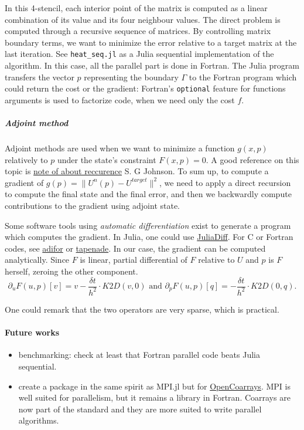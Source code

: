 \documentclass[11pt]{article}
\providecommand{\tightlist}{%
      \setlength{\itemsep}{0pt}\setlength{\parskip}{0pt}}
\begin{document}
In this 4-stencil, each interior point of the matrix is computed as a linear combination of 
its value and its four neighbour values. The direct problem is computed through 
a recursive sequence of matrices. By controlling matrix boundary terms, we want to
minimize the error relative to a target matrix at the last iteration. See \texttt{heat\_seq.jl} 
as a Julia sequential implementation of the algorithm. In this case, all the parallel part is 
done in Fortran. The Julia program transfers the vector \(p\) representing the boundary
\(\Gamma\) to the Fortran program which could return the cost or the gradient: 
Fortran's \texttt{optional} feature for functions arguments is used to factorize code, when we 
need only the cost $f$.

\hypertarget{adjoint-method}{%
\subparagraph{Adjoint method}\label{adjoint-method}}

Adjoint methods are used when we want to minimize a function \(g(x,p)\) relatively to $p$ under
the state's constraint \(F(x,p) = 0\). A good reference on this topic is
\href{https://github.com/mitmath/18335/blob/master/notes/adjoint/recurrence2.pdf}{note
of about reccurence} S. G Johnson. 
To sum up, to compute a gradient of \(g(p)= \| U^n(p) - U^{target} \|^2\), we need to apply a
direct recursion to compute the final state and the final error, and then we backwardly compute 
contributions to the gradient using adjoint state. 

Some software tools using \emph{automatic differentiation} exist to
generate a program which computes the gradient. In Julia, 
one could use \href{https://www.juliadiff.org/}{JuliaDiff}. For C or Fortran
codes, see \href{https://www.mcs.anl.gov/research/projects/adifor/}{adifor} or
\href{http://tapenade.inria.fr:8080/tapenade/index.jsp}{tapenade}. In
our case, the gradient can be computed analytically. Since
\(F\) is linear, partial differential of \(F\) relative to \(U\) and
\(p\) is \(F\) herself, zeroing the other component.
\[ \partial_uF(u,p)[v] =  v - \frac{\delta t}{h^2} \cdot K2D(v,0) \mbox{ and }
\partial_pF(u,p)[q] =  - \frac{\delta t}{h^2} \cdot K2D(0,q). \] 

One could remark that the two operators are very sparse, which is practical.

\hypertarget{future-works}{%
\paragraph{Future works}\label{future-works}}

\begin{itemize}
\tightlist
\item
  benchmarking: check at least that Fortran parallel code beats Julia sequential.
\item
  create a package in the same spirit as MPI.jl but
  for \href{https://github.com/sourceryinstitute/opencoarrays}{OpenCoarrays}.
  MPI is well suited for parallelism, but it remains a library in
  Fortran. Coarrays are now part of the standard and they are more
  suited to write parallel algorithms.
\end{itemize}
\end{document}
